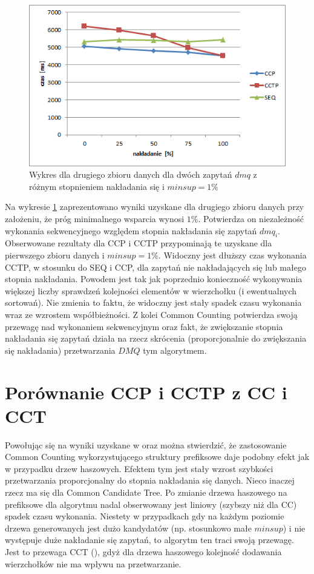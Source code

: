 \begin{figure}[h]
	\centering
	\includegraphics[width=0.8\linewidth]{figures/chart_50_1}
	\caption{Wykres dla drugiego zbioru danych dla dwóch zapytań \(dmq\) z różnym stopnieniem nakładania się i \(minsup = 1\%\)}
	\label{fig:chart_50_1}
\end{figure}
Na wykresie \ref{fig:chart_50_1} zaprezentowano wyniki uzyskane dla drugiego zbioru danych przy założeniu, że próg minimalnego wsparcia wynosi \(1\%\). Potwierdza on niezależność wykonania sekwencyjnego względem stopnia nakładania się zapytań \(dmq_i\). Obserwowane rezultaty dla CCP i CCTP przypominają te uzyskane dla pierwszego zbioru danych i \(minsup = 1\%\). Widoczny jest dłuższy czas wykonania CCTP, w stosunku do SEQ i CCP, dla zapytań nie nakładających się lub małego stopnia nakładania. Powodem jest tak jak poprzednio konieczność wykonywania większej liczby sprawdzeń kolejności elementów w wierzchołku (i ewentualnych sortowań). Nie zmienia to faktu, że widoczny jest stały spadek czasu wykonania wraz ze wzrostem współbieżności. Z kolei Common Counting potwierdza swoją przewagę nad wykonaniem sekwencyjnym oraz fakt, że zwiększanie stopnia nakładania się zapytań działa na rzecz skrócenia (proporcjonalnie do zwiększania się nakładania) przetwarzania \(DMQ\) tym algorytmem. 

\section{Porównanie CCP i CCTP z CC i CCT}
\label{c54}
Powołując się na wyniki uzyskane w \cite{WojciechowskiCC} oraz \cite{WojciechowskiCCT} można stwierdzić, że zastosowanie Common Counting wykorzystującego struktury prefiksowe daje podobny efekt jak w przypadku drzew haszowych. Efektem tym jest stały wzrost szybkości przetwarzania proporcjonalny do stopnia nakładania się danych. Nieco inaczej rzecz ma się dla Common Candidate Tree. Po zmianie drzewa haszowego na prefiksowe dla algorytmu nadal obserwowany jest liniowy (szybszy niż dla CC) spadek czasu wykonania. Niestety w przypadkach gdy na każdym poziomie drzewa generowanych jest dużo kandydatów (np. stosunkowo małe \(minsup\)) i nie występuje duże nakładanie się zapytań, to algorytm ten traci swoją przewagę. Jest to przewaga CCT (\cite{WojciechowskiCCT}), gdyż dla drzewa haszowego kolejność dodawania wierzchołków nie ma wpływu na przetwarzanie.

